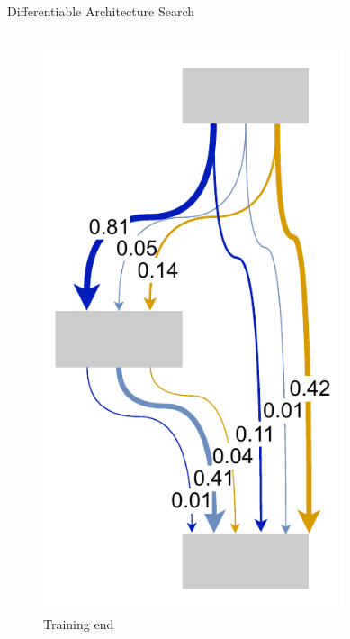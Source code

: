 \documentclass[]{beamer}
\begin{document}
\begin{frame}{Differentiable Architecture Search}
\begin{columns}
\begin{column}{.3\textwidth}
\begin{figure}
	\includegraphics[scale=0.4, center]{graphics/quick/darts_2.drawio.pdf}
	\caption{Training end}
\end{figure}
\end{column}
\begin{column}{.35\textwidth}
\begin{figure}

\end{figure}
\end{column}
\end{columns}
\end{frame}
\end{document}
